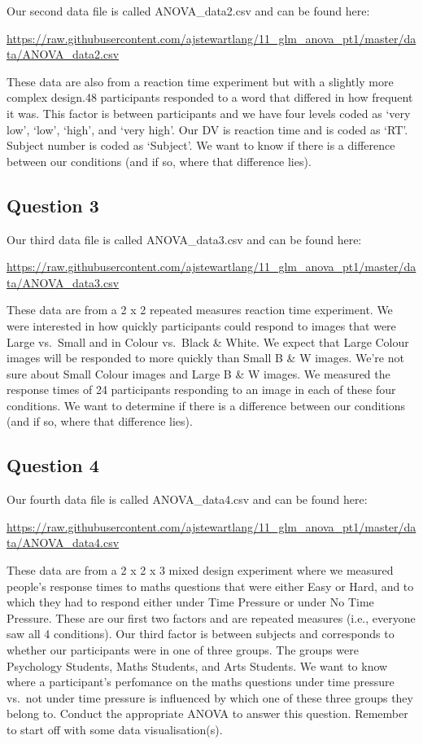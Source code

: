 \documentclass[
]{book}
\begin{document}
Our second data file is called ANOVA\_data2.csv and can be found here:

\url{https://raw.githubusercontent.com/ajstewartlang/11_glm_anova_pt1/master/data/ANOVA_data2.csv}

These data are also from a reaction time experiment but with a slightly more complex design.48 participants responded to a word that differed in how frequent it was. This factor is between participants and we have four levels coded as `very low', `low', `high', and `very high'. Our DV is reaction time and is coded as `RT'. Subject number is coded as `Subject'. We want to know if there is a difference between our conditions (and if so, where that difference lies).

\hypertarget{question-3}{%
\subsection{Question 3}\label{question-3}}

Our third data file is called ANOVA\_data3.csv and can be found here:

\url{https://raw.githubusercontent.com/ajstewartlang/11_glm_anova_pt1/master/data/ANOVA_data3.csv}

These data are from a 2 x 2 repeated measures reaction time experiment. We were interested in how quickly participants could respond to images that were Large vs.~Small and in Colour vs.~Black \& White. We expect that Large Colour images will be responded to more quickly than Small B \& W images. We're not sure about Small Colour images and Large B \& W images. We measured the response times of 24 participants responding to an image in each of these four conditions. We want to determine if there is a difference between our conditions (and if so, where that difference lies).

\hypertarget{question-4}{%
\subsection{Question 4}\label{question-4}}

Our fourth data file is called ANOVA\_data4.csv and can be found here:

\url{https://raw.githubusercontent.com/ajstewartlang/11_glm_anova_pt1/master/data/ANOVA_data4.csv}

These data are from a 2 x 2 x 3 mixed design experiment where we measured people's response times to maths questions that were either Easy or Hard, and to which they had to respond either under Time Pressure or under No Time Pressure. These are our first two factors and are repeated measures (i.e., everyone saw all 4 conditions). Our third factor is between subjects and corresponds to whether our participants were in one of three groups. The groups were Psychology Students, Maths Students, and Arts Students. We want to know where a participant's perfomance on the maths questions under time pressure vs.~not under time pressure is influenced by which one of these three groups they belong to. Conduct the appropriate ANOVA to answer this question. Remember to start off with some data visualisation(s).
\end{document}
